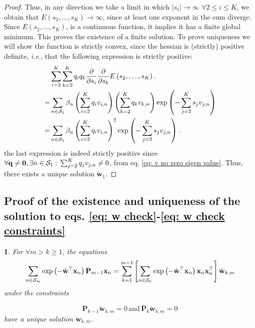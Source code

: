 \documentclass[twoside,11pt,english]{article}
\newtheorem{lem}[thm]{\protect\lemmaname}
\providecommand{\lemmaname}{Lemma}
\providecommand{\lemmaname}{Lemma}
\begin{document}
\begin{proof}
Thus, in any direction we take a limit in which $\left|s_{i}\right|\rightarrow\infty$
$\forall2\leq i\leq K$, we obtain that $E\left(s_{2},\dots,s_{K}\right)\rightarrow\infty$,
since at least one exponent in the sum diverge. Since $E\left(s_{2},\dots,s_{K}\right)$,
is a continuous function, it implies it has a finite global minimum.
This proves the existence of a finite solution. To prove uniqueness
we will show the function is strictly convex, since the hessian is
(strictly) positive definite, \emph{i.e.}, that the following expression
is strictly positive: 
\begin{align*}
 & \sum_{i=2}^{K}\sum_{k=2}^{K}q_{i}q_{k}\frac{\partial}{\partial s_{i}}\frac{\partial}{\partial s_{k}}E\left(s_{2},\dots,s_{K}\right).\\
= & \sum_{n\in\mathcal{S}_{1}}\beta_{n}\left(\sum_{i=2}^{K}q_{i}v_{i,n}\right)\left(\sum_{k=2}^{K}q_{k}v_{k,n}\right)\exp\left(-\sum_{j=2}^{K}s_{j}v_{j,n}\right)\\
= & \sum_{n\in\mathcal{S}_{1}}\beta_{n}\left(\sum_{i=2}^{K}q_{i}v_{i,n}\right)^{2}\exp\left(-\sum_{j=2}^{K}s_{j}v_{j,n}\right)\,.
\end{align*}
the last expression is indeed strictly positive since $\forall\mathbf{q}\neq\mathbf{0},\exists n\in\mathcal{S}_{1}:\,\sum_{j=2}^{K}q_{j}v_{j,n}\neq0$,
from eq. \ref{eq: v no zero eigen value}. Thus, there exists a unique
solution $\tilde{\mathbf{w}}_{1}$. 
\end{proof}

\subsection{Proof of the existence and uniqueness of the solution to eqs. \ref{eq: w check}-\ref{eq: w check constraints}\label{subsec: existence 2}}
\begin{lem}
For $\forall m>k\geq1$, the equations
\begin{equation}
\sum_{n\in\mathcal{S}_{m}}\exp\left(-\tilde{\mathbf{w}}^{\top}\mathbf{x}_{n}\right)\mathbf{P}_{m-1}\mathbf{x}_{n}=\sum_{k=1}^{m-1}\left[\sum_{n\in\mathcal{S}_{k}}\exp\left(-\tilde{\mathbf{w}}^{\top}\mathbf{x}_{n}\right)\mathbf{x}_{n}\mathbf{x}_{n}^{\top}\right]\check{\mathbf{w}}_{k,m}\label{eq: w check proof}
\end{equation}
under the constraints

\begin{equation}
\mathbf{P}_{k-1}\check{\mathbf{w}}_{k,m}=0\,\mathrm{and}\,\mathbf{\bar{P}}_{k}\check{\mathbf{w}}_{k,m}=0\,\label{eq: w check constraints-1}
\end{equation}
have a unique solution $\check{\mathbf{w}}_{k,m}$.
\end{lem}
\end{document}
